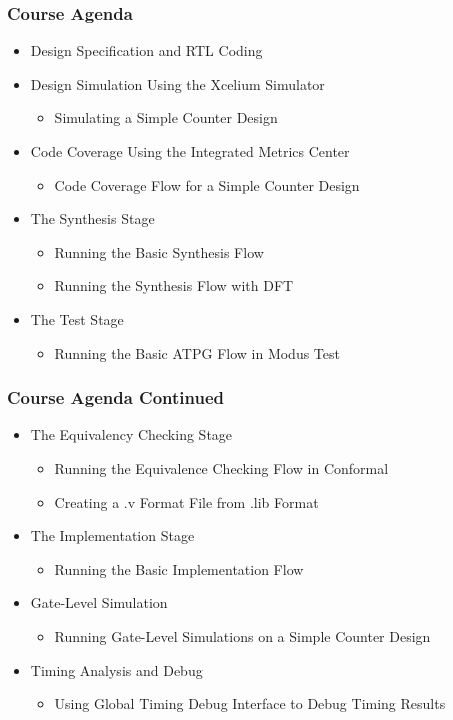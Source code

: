 \documentclass{beamer}
\begin{document}
\begin{frame}
\frametitle{Course Agenda}

\begin{itemize}
\item Design Specification and RTL Coding
\item Design Simulation Using the Xcelium Simulator
	\begin{itemize}
	\item Simulating a Simple Counter Design
	\end{itemize}
\item Code Coverage Using the Integrated Metrics Center
	\begin{itemize}
	\item Code Coverage Flow for a Simple Counter Design
	\end{itemize}
\item The Synthesis Stage
	\begin{itemize}
	\item Running the Basic Synthesis Flow
	\item Running the Synthesis Flow with DFT
	\end{itemize}
\item The Test Stage
	\begin{itemize}
	\item Running the Basic ATPG Flow in Modus Test
	\end{itemize}

\end{itemize}
\end{frame}

\begin{frame}
\frametitle{Course Agenda Continued}

\begin{itemize}
\item The Equivalency Checking Stage
\begin{itemize}
	\item Running the Equivalence Checking Flow in Conformal
	\item Creating a .v Format File from .lib Format
\end{itemize}
\item The Implementation Stage
\begin{itemize}
	\item Running the Basic Implementation Flow
\end{itemize}
\item Gate-Level Simulation  
\begin{itemize}  
	\item Running Gate-Level Simulations on a Simple Counter Design
\end{itemize}
\item Timing Analysis and Debug
\begin{itemize}
	\item Using Global Timing Debug Interface to Debug Timing Results
\end{itemize}
\end{itemize}
\end{frame}
\end{document}
